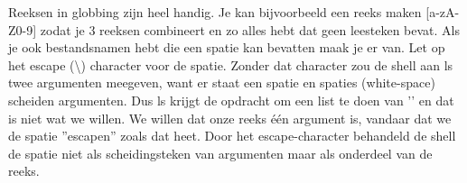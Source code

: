 Reeksen in globbing zijn heel handig. Je kan bijvoorbeeld een reeks maken [a-zA-Z0-9] zodat je 3 reeksen combineert en zo alles hebt dat geen leesteken bevat. Als je ook bestandsnamen hebt die een spatie kan bevatten maak je er  van. Let op het escape (\textbackslash) character voor de spatie. Zonder dat character zou de shell aan ls twee argumenten meegeven, want er staat een spatie en spaties (white-space) scheiden argumenten. Dus ls krijgt de opdracht om een list te doen van '' en dat is niet wat we willen. We willen dat onze reeks \'{e}\'{e}n argument is, vandaar dat we de spatie ''escapen'' zoals dat heet. Door het escape-character behandeld de shell de spatie niet als scheidingsteken van argumenten maar als onderdeel van de reeks.
